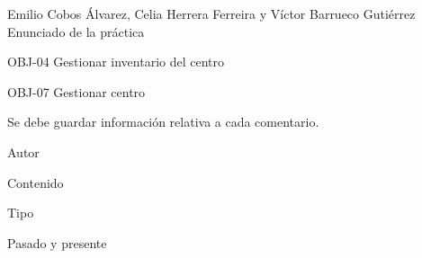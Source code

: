 {Emilio Cobos Álvarez, Celia Herrera Ferreira y Víctor Barrueco Gutiérrez}
{Enunciado de la práctica}
{OBJ-04 Gestionar inventario del centro \par
OBJ-07 Gestionar centro}
{}
{Se debe guardar información relativa a cada comentario.}
{
\item{Autor}
\item{Contenido}
\item{Tipo}
}
{Pasado y presente}

